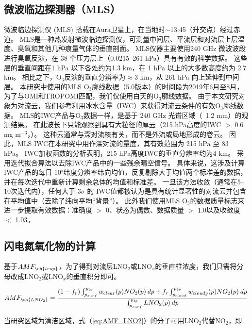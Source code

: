 \subsection{微波临边探测器（MLS）}

微波临边探测仪 (MLS) 搭载在Aura卫星上，在当地时$\sim$13:45（升交点）经过赤道。
MLS是一种热发射微波临边探测仪，可测量中间层、平流层和对流层上层温度、臭氧和其他几种痕量气体的垂直剖面。
MLS仪器主要使用240 GHz 微波波段进行臭氧反演，在 38 个压力层上（0.0215--261 hPa）具有有效的科学数据。
这些层的垂直间距在1 hPa 以下各处约为1.3 km，在 1 hPa 以上的大多数高度约为 2.7 km。
相比之下，O$_3$反演的垂直分辨率为$\approx$3 km，从 261 hPa 向上延伸到中间层。
本研究中使用的MLS O$_3$廓线数据（5.0版本）的时间段为2019年6月至8月，为了与OMI和TROPOMI匹配，我们仅使用白天的O$_3$廓线数据。
由于本文研究对象为对流云，我们参考\citet{Livesey.2013}利用冰水含量（IWC）来获得对流云条件的有效O$_3$廓线数据。
MLS的IWC产品与O$_3$数据一样，是基于 240 GHz 光谱区域（~1.2 mm）的观测结果。
在此波长下只能观察到具有大粒径的厚云（215 hPa高度的IWC $>$ 0.6 mg m$^{-3}$，\citep{Wu.2008}）。 这种云通常与深对流核有关，而不是外流或局地形成的卷云。
因此，MLS IWC在本研究中用作深对流的量度，其有效范围为 215 hPa 至 83 hPa。
IWC加权函数的分析表明，215 hPa高度IWC的垂直分辨率约为4 km\citep{Wu.2008}。
\citet{Livesey.2013}采用迭代拟合算法以去除IWC产品中的一些残余晴空信号。
具体来说，这涉及计算IWC产品的每日 10$^{\circ}$纬度分辨率纬向均值，反复剔除大于均值两个标准差的数据，
并在每次迭代中重新计算剩余总体的均值和标准差。
一旦该方法收敛（通常在5--10次迭代内），任何大于 3$\sigma$ 的 IWC值都被认为是具有统计显著性的对流云并包含在平均值中（去除了纬向平均“背景”）。
此外我们使用MLS O$_3$的数据质量标志来进一步提取有效数据：准确度 $>$ 0、状态为偶数、数据质量 $>$ 1.0以及收敛度 $<$ 1.03。


\subsection{闪电氮氧化物的计算} \label{sec:amf_definition}

基于$AMF_{\ch{trop}}$，为了得到对流层LNO$_2$或LNO$_x$的垂直柱浓度，我们只需将分母改成LNO$_2$或LNO$_x$的垂直积分即可。

\begin{equation} \label{eq:AMF_LNO2}
AMF_{\ch{LNO_2}} = \frac{(1-f_r) \int_{p_{surf}}^{p_{tp}} w_{clear}(p) NO_2(p) \: dp + f_r \int_{p_{cloud}}^{p_{tp}} w_{cloudy}(p) NO_2(p) \: dp}{\int_{p_{surf}}^{p_{tp}} LNO_2(p) \: dp}
\end{equation}

当研究区域为清洁区域，式（\ref{eq:AMF_LNO2}）的分子可用LNO$_2$代替NO$_2$，即

